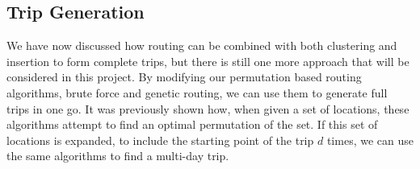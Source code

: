 \noindent
{}

\subsection{Trip Generation}\label{subsec:trip-generation}
We have now discussed how routing can be combined with both clustering and insertion to form complete trips, but
there is still one more approach that will be considered in this project.
By modifying our permutation based routing algorithms, brute force and genetic routing, we can use them to generate
full trips in one go.
It was previously shown how, when given a set of locations, these algorithms attempt to find an optimal permutation
of the set.
If this set of locations is expanded, to include the starting point of the trip $d$ times, we can use the same
algorithms to find a multi-day trip.